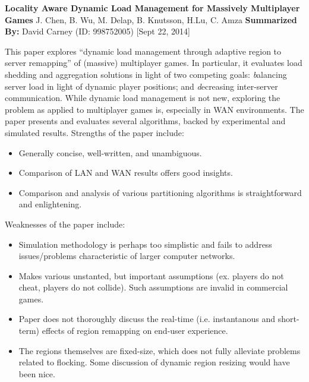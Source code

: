 \documentclass[11pt]{report}
\begin{document}
\noindent\textbf{Locality Aware Dynamic Load Management for Massively Multiplayer Games}\newline
J. Chen, B. Wu, M. Delap, B. Knutsson, H.Lu, C. Amza
\newline
\noindent\textbf{Summarized By:} David Carney (ID: 998752005) [Sept 22, 2014]\newline

This paper explores ``dynamic load management through adaptive region to server
remapping'' of (massive) multiplayer games. In particular, it evaluates load
shedding and aggregation solutions in light of two competing goals: {\textit
balancing server load} in light of dynamic player positions; and {\textit
decreasing inter-server communication}. While dynamic load management is not
new, exploring the problem as applied to multiplayer games is, especially
in WAN environments. The paper presents and evaluates several algorithms,
backed by experimental and simulated results.
\newline
\newline
\noindent Strengths of the paper include:
\begin{itemize}
\item Generally concise, well-written, and unambiguous.
\item Comparison of LAN and WAN results offers good insights.
\item Comparison and analysis of various partitioning algorithms is straightforward and enlightening.
\end{itemize}

\noindent Weaknesses of the paper include:
\begin{itemize}
\item Simulation methodology is perhaps too simplistic and fails to address issues/problems characteristic of larger computer networks.
\item Makes various unstanted, but important assumptions (ex. players do not cheat, players do not collide). Such assumptions are invalid in commercial games.
\item Paper does not thoroughly discuss the real-time (i.e. instantanous and short-term) effects of region remapping on end-user experience.
\item The regions themselves are fixed-size, which does not fully alleviate problems related to flocking. Some discussion of dynamic region resizing would have been nice.
\end{itemize}
\end{document}
